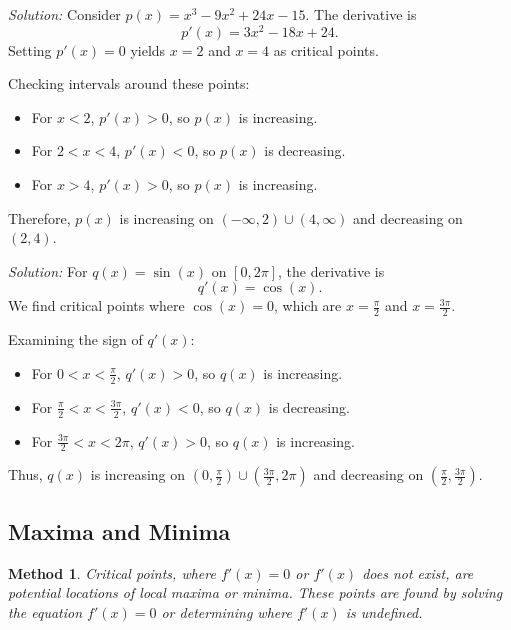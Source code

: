 \documentclass[a4paper,12pt]{book}
\newenvironment{solution}[1][]
{\par\noindent\textit{Solution:} \rmfamily}{\medskip}
\newtheorem{method}{Method}
\begin{document}
\begin{solution}[Problem 4]
Consider \( p(x) = x^3 - 9x^2 + 24x - 15 \). The derivative is
\[ p'(x) = 3x^2 - 18x + 24. \]
Setting \( p'(x) = 0 \) yields \( x = 2 \) and \( x = 4 \) as critical points.

Checking intervals around these points:
\begin{itemize}
    \item For \( x < 2 \), \( p'(x) > 0 \), so \( p(x) \) is increasing.
    \item For \( 2 < x < 4 \), \( p'(x) < 0 \), so \( p(x) \) is decreasing.
    \item For \( x > 4 \), \( p'(x) > 0 \), so \( p(x) \) is increasing.
\end{itemize}
Therefore, \( p(x) \) is increasing on \((- \infty, 2) \cup (4, \infty)\) and decreasing on \((2, 4)\).
\end{solution}

\begin{solution}[Problem 5]
For \( q(x) = \sin(x) \) on \( [0, 2\pi] \), the derivative is
\[ q'(x) = \cos(x). \]
We find critical points where \( \cos(x) = 0 \), which are \( x = \frac{\pi}{2} \) and \( x = \frac{3\pi}{2} \).

Examining the sign of \( q'(x) \):
\begin{itemize}
    \item For \( 0 < x < \frac{\pi}{2} \), \( q'(x) > 0 \), so \( q(x) \) is increasing.
    \item For \( \frac{\pi}{2} < x < \frac{3\pi}{2} \), \( q'(x) < 0 \), so \( q(x) \) is decreasing.
    \item For \( \frac{3\pi}{2} < x < 2\pi \), \( q'(x) > 0 \), so \( q(x) \) is increasing.
\end{itemize}
Thus, \( q(x) \) is increasing on \((0, \frac{\pi}{2}) \cup (\frac{3\pi}{2}, 2\pi)\) and decreasing on \((\frac{\pi}{2}, \frac{3\pi}{2})\).
\end{solution}

\subsection{Maxima and Minima}
\begin{method}
Critical points, where \( f'(x) = 0 \) or \( f'(x) \) does not exist, are potential locations of local maxima or minima. These points are found by solving the equation \( f'(x) = 0 \) or determining where \( f'(x) \) is undefined.
\end{method}
\end{document}
